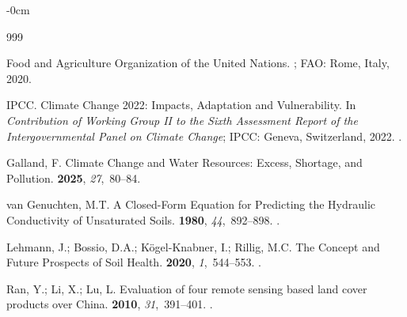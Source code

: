 \documentclass[land,review,accept,pdftex,oneauthor]{Definitions/mdpi}
\begin{document}
\begin{adjustwidth}{-\extralength}{0cm}

\begin{thebibliography}{999}

{Food and Agriculture Organization of the United Nations}.
; FAO: Rome, Italy,  2020.

{IPCC}.
\newblock Climate Change 2022: Impacts, Adaptation and Vulnerability.
  In \emph{Contribution of Working Group {II} to the Sixth Assessment Report of the
  Intergovernmental Panel on Climate Change};  IPCC: Geneva, Switzerland, %
 2022.
.

Galland, F.
\newblock Climate Change and Water Resources: Excess, Shortage, and Pollution.
 {\bf 2025}, {\em 27},~80--84.

van Genuchten, M.T.
\newblock A Closed-Form Equation for Predicting the Hydraulic Conductivity of
  Unsaturated Soils. %
 {\bf 1980}, {\em
  44},~892--898.
.

Lehmann, J.; Bossio, D.A.; K{\"o}gel-Knabner, I.; Rillig, M.C.
\newblock The Concept and Future Prospects of Soil Health.
 {\bf 2020}, {\em
  1},~544--553.
.

Ran, Y.; Li, X.; Lu, L.
\newblock Evaluation of four remote sensing based land cover products over
  China.
 {\bf 2010}, {\em
  31},~391--401.
.


\end{thebibliography}
\end{adjustwidth}
\end{document}
